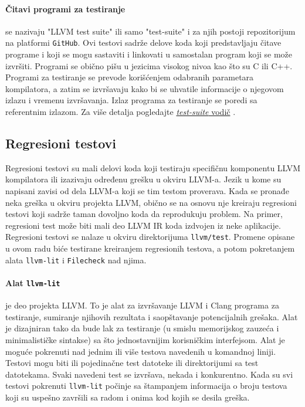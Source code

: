 \documentclass[12pt,oneside]{memoir}
\begin{document}
\paragraph{Čitavi programi za testiranje} se nazivaju "LLVM test suite" ili samo "test-suite" i za njih postoji repozitorijum na platformi \texttt{GitHub}. 
Ovi testovi sadrže delove koda koji predstavljaju čitave programe i koji se mogu sastaviti i linkovati u samostalan program koji se može izvršiti. Programi se obično pišu u jezicima visokog nivoa kao što su C ili C++.
Programi za testiranje se prevode korišćenjem odabranih parametara kompilatora, a zatim se izvršavaju kako bi se uhvatile informacije o njegovom izlazu i vremenu izvršavanja. Izlaz programa za testiranje se poredi sa referentnim izlazom. Za više detalja pogledajte \href{https://www.llvm.org/docs/TestSuiteGuide.html}{\textit{test-suite} vodič} \cite{test_suite}.

\subsection{Regresioni testovi}
{Regresioni testovi} su mali delovi koda koji testiraju specifičnu komponentu LLVM kompilatora ili izazivaju određenu grešku u okviru LLVM-a. Jezik u kome su napisani zavisi od dela LLVM-a koji se tim testom proverava. 
Kada se pronađe neka greška u okviru projekta LLVM, obično se na osnovu nje kreiraju regresioni testovi koji sadrže taman dovoljno koda da reprodukuju problem. %
Na primer, regresioni test može biti mali deo LLVM IR koda izdvojen iz neke aplikacije. %
Regresioni testovi se nalaze u okviru direktorijuma \texttt{llvm/test}.
Promene opisane u ovom radu biće testirane kreiranjem regresionih testova, a potom pokretanjem alata \texttt{llvm-lit} \cite{lit} i \texttt{Filecheck} \cite{filecheck} nad njima.

\paragraph{Alat \texttt{llvm-lit}} je deo projekta LLVM.  To je alat za izvršavanje LLVM i Clang programa za testiranje, sumiranje njihovih rezultata i saopštavanje potencijalnih grešaka. Alat je dizajniran tako da bude lak za testiranje (u smislu memorijskog zauzeća i minimalističke sintakse) sa što jednostavnijim korisničkim interfejsom. Alat je moguće pokrenuti nad jednim ili više testova navedenih u komandnoj liniji. Testovi mogu biti ili pojedinačne test datoteke ili direktorijumi sa test datotekama. Svaki navedeni test se izvršava, nekada i konkurentno. Kada su svi testovi pokrenuti \texttt{llvm-lit} počinje sa štampanjem informacija o broju testova koji su uspešno završili sa radom i onima kod kojih se desila greška.
\end{document}
